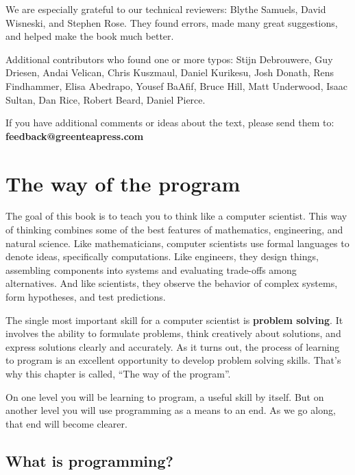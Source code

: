 \documentclass[12pt]{book}
\theoremstyle{exercise}
\begin{document}
We are especially grateful to our technical reviewers: Blythe Samuels, David Wisneski, and Stephen Rose.
They found errors, made many great suggestions, and helped make the book much better.

Additional contributors who found one or more typos: Stijn Debrouwere, Guy Driesen, Andai Velican, Chris Kuszmaul, Daniel Kurikesu, Josh Donath, Rens Findhammer, Elisa Abedrapo, Yousef BaAfif, Bruce Hill, Matt Underwood, Isaac Sultan, Dan Rice, Robert Beard, Daniel Pierce.

If you have additional comments or ideas about the text, please send them to: {\bf feedback@greenteapress.com}


\mainmatter


\chapter{The way of the program}
\label{theway}

The goal of this book is to teach you to think like a computer scientist.
This way of thinking combines some of the best features of mathematics, engineering, and natural science.
Like mathematicians, computer scientists use formal languages to denote ideas, specifically computations.
Like engineers, they design things, assembling components into systems and evaluating trade-offs among alternatives.
And like scientists, they observe the behavior of complex systems, form hypotheses, and test predictions.


The single most important skill for a computer scientist is {\bf problem solving}.
It involves the ability to formulate problems, think creatively about solutions, and express solutions clearly and accurately.
As it turns out, the process of learning to program is an excellent opportunity to develop problem solving skills.
That's why this chapter is called, ``The way of the program''.

On one level you will be learning to program, a useful skill by itself.
But on another level you will use programming as a means to an end.
As we go along, that end will become clearer.


\section{What is programming?}
\end{document}
